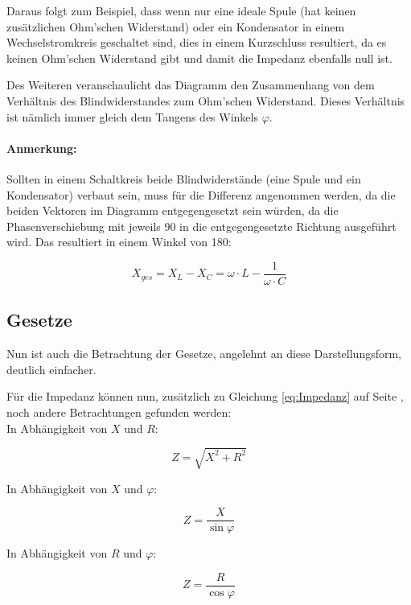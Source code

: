 
\vspace{11pt}

Daraus folgt zum Beispiel, dass wenn nur eine ideale Spule (hat keinen zusätzlichen Ohm'schen Widerstand) oder ein Kondensator in einem Wechselstromkreis geschaltet sind, dies in einem Kurzschluss resultiert, da es keinen Ohm'schen Widerstand gibt und damit die Impedanz ebenfalls null ist.

Des Weiteren veranschaulicht das Diagramm den Zusammenhang von dem Verhältnis des Blindwiderstandes zum Ohm'schen Widerstand. Dieses Verhältnis ist nämlich immer gleich dem Tangens des Winkels $\varphi$.

\paragraph{Anmerkung:}

Sollten in einem Schaltkreis beide Blindwiderstände (eine Spule und ein Kondensator) verbaut sein, muss für die Differenz angenommen werden, da die beiden Vektoren im Diagramm entgegengesetzt sein würden, da die Phasenverschiebung mit jeweils 90\degree{} in die entgegengesetzte Richtung ausgeführt wird. Das resultiert in einem Winkel von 180\degree :

\begin{equation}	\label{eq:BlindwiderstandSumme}
	X_{ges} = X_L - X_C = \omega \cdot L - \frac{1}{\omega \cdot C}
\end{equation}



\subsection{Gesetze}	\label{subsec:WiderstaendeGesetzte}

Nun ist auch die Betrachtung der Gesetze, angelehnt an diese Darstellungsform, deutlich einfacher.


Für die Impedanz können nun, zusätzlich zu Gleichung \ref{eq:Impedanz} auf Seite \pageref{eq:Impedanz}, noch andere Betrachtungen gefunden werden: \\ In Abhängigkeit von $X$ und $R$:

\begin{equation}	\label{eq:ImepdanzXR}
	Z = \sqrt{X^2 + R^2}
\end{equation}


\hspace{-6mm}In Abhängigkeit von $X$ und $\varphi$:

\begin{equation}	\label{eq:ImepdanzXphi}
	Z = \frac{X}{\sin\varphi}
\end{equation}


\hspace{-6mm}In Abhängigkeit von $R$ und $\varphi$:

\begin{equation}	\label{eq:ImepdanzRphi}
	Z = \frac{R}{\cos\varphi}
\end{equation}









